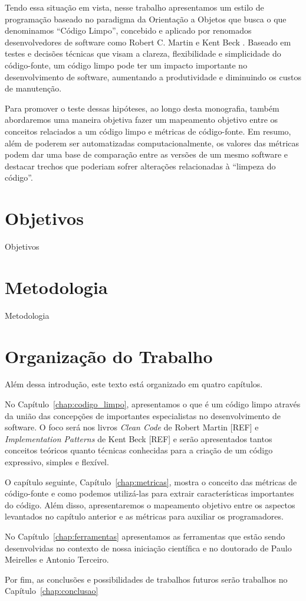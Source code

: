 Tendo essa situação em vista, nesse trabalho apresentamos um estilo de programação baseado
no paradigma da Orientação a Objetos que busca o que denominamos ``Código Limpo'', concebido e aplicado por renomados desenvolvedores de software
como Robert C. Martin \cite{} e Kent Beck \cite{}. Baseado em testes e decisões técnicas que visam a clareza, flexibilidade
e simplicidade do código-fonte, um código limpo pode ter um impacto importante no desenvolvimento 
de software, aumentando a produtividade e diminuindo os custos de manutenção.

Para promover o teste dessas hipóteses, ao longo desta monografia, também abordaremos uma maneira objetiva fazer um mapeamento objetivo 
entre os conceitos relaciados a um código limpo e métricas de código-fonte. Em resumo, além de poderem ser
automatizadas computacionalmente, os valores das métricas podem dar uma base de comparação entre
as versões de um mesmo software e destacar trechos que poderiam sofrer alterações relacionadas à ``limpeza do código''.

\section{Objetivos}
\label{sec:objetivo}

Objetivos

\section{Metodologia}
\label{sec:metodologia}

Metodologia

\section{Organização do Trabalho}
\label{sec:organizacao_trabalho}

Além dessa introdução, este texto está organizado em quatro capítulos.

No Capítulo~\ref{chap:codigo_limpo}, apresentamos o que é um código limpo através
da união das concepções de importantes especialistas no desenvolvimento de software.
O foco será nos livros \textit{Clean Code} de Robert Martin [REF] e \textit{Implementation
Patterns} de Kent Beck [REF] e serão apresentados tantos conceitos teóricos
quanto técnicas conhecidas para a criação de um código expressivo, simples e flexível.

O capítulo seguinte, Capítulo~\ref{chap:metricas}, mostra o conceito das métricas de 
código-fonte e como podemos utilizá-las para extrair características importantes do
código. Além disso, apresentaremos o mapeamento objetivo entre os aspectos levantados
no capítulo anterior e as métricas para auxiliar os programadores.

No Capítulo~\ref{chap:ferramentas} apresentamos as ferramentas que estão sendo desenvolvidas
no contexto de nossa iniciação científica e no doutorado de Paulo Meirelles e Antonio Terceiro.

Por fim, as conclusões e possibilidades de trabalhos futuros serão trabalhos no Capítulo~\ref{chap:conclusao}